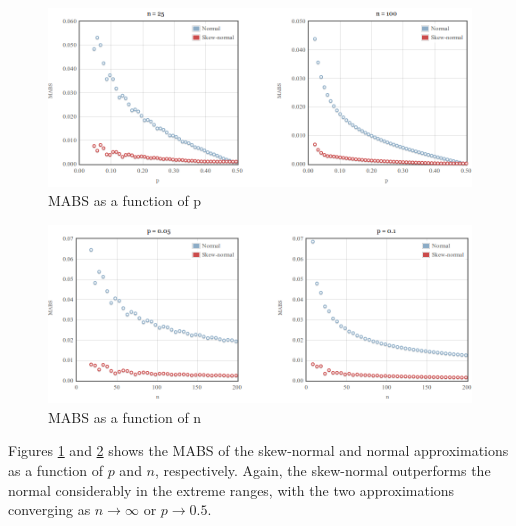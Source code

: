 \documentclass{article}
\begin{document}
\begin{figure}
  \centering
  \includegraphics[width=\textwidth]{../graphs/images/mabs-fixed-n.png}
  \caption{MABS as a function of p}
  \label{fig:mabs-fixed-n}
\end{figure}

\begin{figure}
  \centering
  \includegraphics[width=\textwidth]{../graphs/images/mabs-fixed-p.png}
  \caption{MABS as a function of n}
  \label{fig:mabs-fixed-p}
\end{figure}

Figures \ref{fig:mabs-fixed-n} and \ref{fig:mabs-fixed-p} shows the MABS of the
skew-normal and normal approximations as a function of $p$ and $n$,
respectively. Again, the skew-normal outperforms the normal considerably in the
extreme ranges, with the two approximations converging as $n \rightarrow
\infty$ or $p \rightarrow 0.5$.

\clearpage




\end{document}
